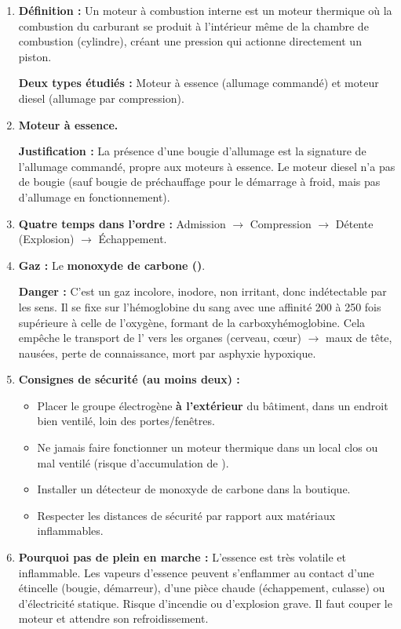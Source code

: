 \documentclass[11pt]{article}
\begin{document}
\begin{corrige}
\begin{enumerate}
\item \textbf{Définition :} Un moteur à combustion interne est un moteur thermique où la combustion du carburant se produit à l'intérieur même de la chambre de combustion (cylindre), créant une pression qui actionne directement un piston.
      \par \textbf{Deux types étudiés :} Moteur à essence (allumage commandé) et moteur diesel (allumage par compression).
\item \textbf{Moteur à essence.}
      \par \textbf{Justification :} La présence d'une bougie d'allumage est la signature de l'allumage commandé, propre aux moteurs à essence. Le moteur diesel n'a pas de bougie (sauf bougie de préchauffage pour le démarrage à froid, mais pas d'allumage en fonctionnement).
\item \textbf{Quatre temps dans l'ordre :} Admission $\rightarrow$ Compression $\rightarrow$ Détente (Explosion) $\rightarrow$ Échappement.
\item \textbf{Gaz :} Le \textbf{monoxyde de carbone ()}.
      \par \textbf{Danger :} C'est un gaz incolore, inodore, non irritant, donc indétectable par les sens. Il se fixe sur l'hémoglobine du sang avec une affinité 200 à 250 fois supérieure à celle de l'oxygène, formant de la carboxyhémoglobine. Cela empêche le transport de l' vers les organes (cerveau, cœur) $\rightarrow$ maux de tête, nausées, perte de connaissance, mort par asphyxie hypoxique.
\item \textbf{Consignes de sécurité (au moins deux) :}
      \begin{itemize}
      \item Placer le groupe électrogène \textbf{à l'extérieur} du bâtiment, dans un endroit bien ventilé, loin des portes/fenêtres.
      \item Ne jamais faire fonctionner un moteur thermique dans un local clos ou mal ventilé (risque d'accumulation de ).
      \item Installer un détecteur de monoxyde de carbone dans la boutique.
      \item Respecter les distances de sécurité par rapport aux matériaux inflammables.
      \end{itemize}
\item \textbf{Pourquoi pas de plein en marche :} L'essence est très volatile et inflammable. Les vapeurs d'essence peuvent s'enflammer au contact d'une étincelle (bougie, démarreur), d'une pièce chaude (échappement, culasse) ou d'électricité statique. Risque d'incendie ou d'explosion grave. Il faut couper le moteur et attendre son refroidissement.
\end{enumerate}


\end{corrige}
\end{document}
